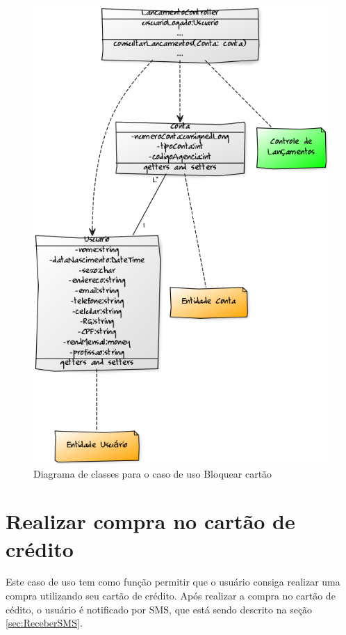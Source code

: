 \begin{figure}[!htb]
     \centering
     \includegraphics[scale=0.5]{diagramas/diagrama-de-classe/imagens/acompanharLancamentos.png}
     \caption{Diagrama de classes para o caso de uso Bloquear cartão}
     \label{ddc:acompanharLancamentos}
\end{figure}

\section{Realizar compra no cartão de crédito}

Este caso de uso tem como função permitir que o usuário consiga realizar uma compra utilizando seu cartão de crédito.
Após realizar a compra no cartão de cédito, o usuário é notificado por SMS, que está sendo descrito na seção \ref{sec:ReceberSMS}.

